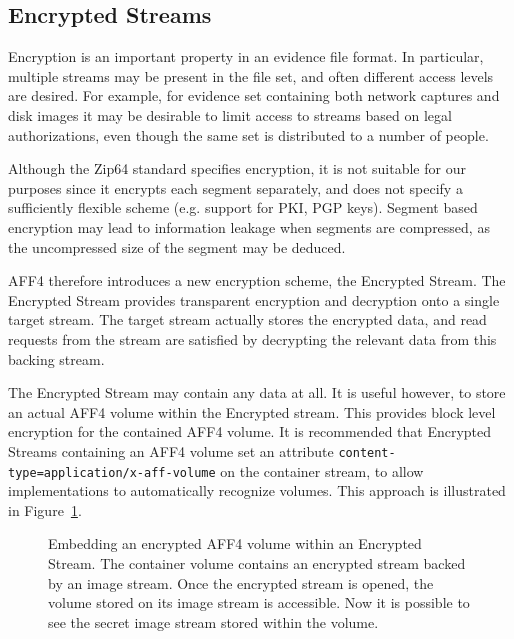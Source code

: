 \documentclass[10pt, conference]{IEEEtran}
\begin{document}
\subsection{Encrypted Streams}
\label{crypted_stream}
Encryption is an important property in an evidence file format. In
particular, multiple streams may be present in the file set, and often
different access levels are desired. For example, for evidence set
containing both network captures and disk images it may be desirable
to limit access to streams based on legal authorizations, even though
the same set is distributed to a number of people.

Although the Zip64 standard specifies encryption, it is not suitable
for our purposes since it encrypts each segment separately, and does
not specify a sufficiently flexible scheme (e.g. support for PKI, PGP
keys). Segment based encryption may lead to information leakage when
segments are compressed, as the uncompressed size of the segment may
be deduced.

AFF4 therefore introduces a new encryption scheme, the Encrypted
Stream.  The Encrypted Stream provides transparent encryption and
decryption onto a single target stream. The target stream actually
stores the encrypted data, and read requests from the stream are
satisfied by decrypting the relevant data from this backing
stream. 

The Encrypted Stream may contain any data at all. It is useful
however, to store an actual AFF4 volume within the Encrypted
stream. This provides block level encryption for the contained AFF4
volume. It is recommended that Encrypted Streams containing an AFF4
volume set an attribute \texttt{content-type=application/x-aff-volume}
on the container stream, to allow implementations to automatically
recognize volumes. This approach is illustrated in
Figure~\ref{crypted_fif}.

\begin{figure}[tb]
  \begin{center}
  \mbox{\columnwidth {}}
  \caption{Embedding an encrypted AFF4 volume within an Encrypted
Stream. The container volume contains an encrypted stream backed by an
image stream. Once the encrypted stream is opened, the volume stored
on its image stream is accessible. Now it is possible to see the
secret image stream stored within the volume.}
  \label{crypted_fif}
  \end{center}
\end{figure}
\end{document}
